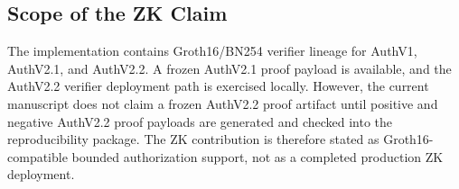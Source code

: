 \subsection{Scope of the ZK Claim}

The implementation contains Groth16/BN254 verifier lineage for AuthV1, AuthV2.1, and AuthV2.2. A frozen AuthV2.1 proof payload is available, and the AuthV2.2 verifier deployment path is exercised locally. However, the current manuscript does not claim a frozen AuthV2.2 proof artifact until positive and negative AuthV2.2 proof payloads are generated and checked into the reproducibility package. The ZK contribution is therefore stated as Groth16-compatible bounded authorization support, not as a completed production ZK deployment.
